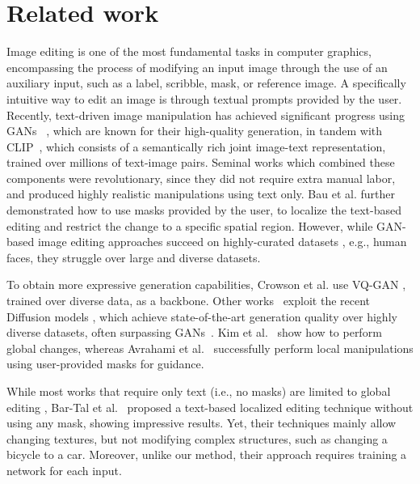 \section{Related work}

Image editing is one of the most fundamental tasks in computer graphics, encompassing the process of modifying an input image through the use of an auxiliary input, such as a label, scribble, mask, or reference image. A specifically intuitive way to edit an image is through textual prompts provided by the user. Recently, text-driven image manipulation has achieved significant progress using GANs ~\cite{goodfellow2014generative,brock2018large,karras2021alias,karras2019style,karras2020analyzing}, which are known for their high-quality generation, in tandem with CLIP~\cite{radford2021learning}, which consists of a semantically rich joint image-text representation, trained over millions of text-image pairs. Seminal works \cite{patashnik2021styleclip,gal2021stylegan, xia2021tedigan, abdal2021clip2stylegan} which combined these components were revolutionary, since they did not require extra manual labor, and produced highly realistic manipulations using text only. Bau et al. \cite{bau2021paint} further demonstrated how to use masks provided by the user, to localize the text-based editing and restrict the change to a specific spatial region. However, while GAN-based image editing approaches succeed on highly-curated datasets \cite{mokady2022self}, e.g., human faces, they struggle over large and diverse datasets.

To obtain more expressive generation capabilities, Crowson et al. \cite{crowson2022vqgan} use VQ-GAN \cite{esser2021taming}, trained over diverse data, as a backbone. Other works~\cite{avrahami2022blended, kim2022diffusionclip} exploit the recent Diffusion models \cite{ho2020denoising,sohl2015deep,song2019generative,ho2020denoising,song2020denoising,rombach2021highresolution}, which achieve state-of-the-art generation quality over highly diverse datasets, often surpassing GANs~\cite{dhariwal2021diffusion}. Kim et al.~\cite{kim2022diffusionclip} show how to perform global changes, whereas Avrahami et al.~\cite{avrahami2022blended} successfully perform local manipulations using user-provided masks for guidance. 

While most works that require only text (i.e., no masks) are limited to global editing  \cite{crowson2022vqgan, kwon2021clipstyler}, Bar-Tal et al.~\cite{bar2022text2live} proposed a text-based localized editing technique without using any mask, showing impressive results. Yet, their techniques mainly allow changing textures, but not modifying complex structures, such as changing a bicycle to a car. Moreover, unlike our method, their approach requires training a network for each input.

